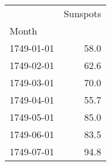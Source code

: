 \begin{tabular}{lr}
\toprule
{} &  Sunspots \\
Month      &           \\
\midrule
1749-01-01 &      58.0 \\
1749-02-01 &      62.6 \\
1749-03-01 &      70.0 \\
1749-04-01 &      55.7 \\
1749-05-01 &      85.0 \\
1749-06-01 &      83.5 \\
1749-07-01 &      94.8 \\
\bottomrule
\end{tabular}
